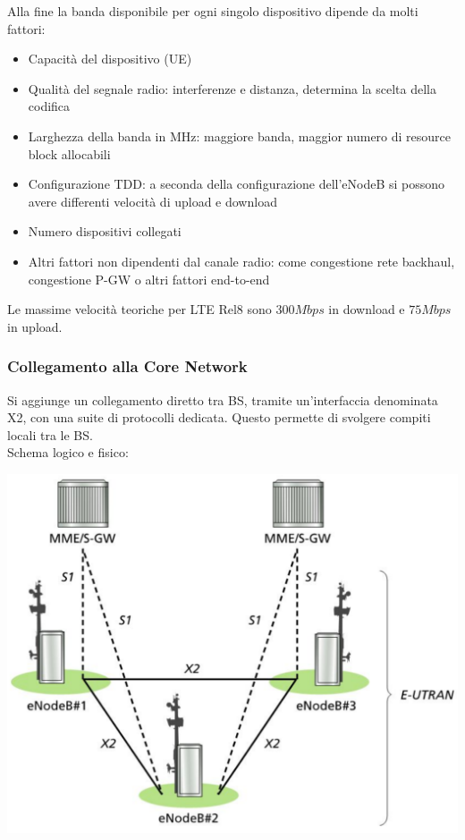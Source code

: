 Alla fine la banda disponibile per ogni singolo dispositivo dipende da molti fattori: 
\begin{itemize}
	\item Capacità del dispositivo (UE)
	\item Qualità del segnale radio: interferenze e distanza, determina la scelta della codifica
	\item Larghezza della banda in MHz: maggiore banda, maggior numero di resource block allocabili
	\item Configurazione TDD: a seconda della configurazione dell'eNodeB si possono avere differenti velocità di upload e download
	\item Numero dispositivi collegati
	\item Altri fattori non dipendenti dal canale radio: come congestione rete backhaul, congestione P-GW o altri fattori end-to-end
\end{itemize}

Le massime velocità teoriche per LTE Rel8 sono $300Mbps$ in download e $75Mbps$ in upload.\\


\subsubsection{Collegamento alla Core Network}

Si aggiunge un collegamento diretto tra BS, tramite un'interfaccia denominata X2, con una suite di protocolli dedicata. Questo permette di svolgere compiti locali tra le BS.\\

Schema logico e fisico:
\begin{center}
	\includegraphics[width=0.6\linewidth]{img/4g/x21}
\end{center}

\newpage

